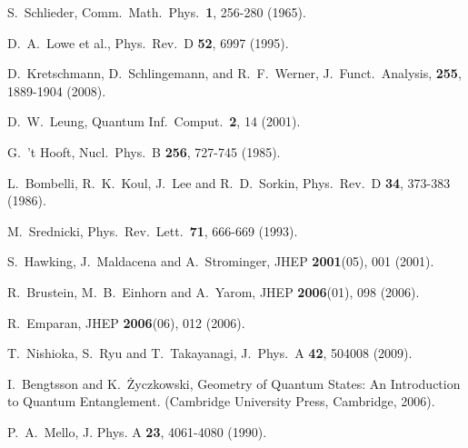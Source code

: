 \documentclass[aps,12pt]{revtex4}
\begin{document}
\begin{thebibliography}{16}
 S.\ Schlieder,
Comm.\ Math.\ Phys.\ {\bf 1}, 256-280 (1965).

 D.\ A.\ Lowe {et al.},
Phys.\ Rev.\ D {\bf 52}, 6997 (1995).

 D.\ Kretschmann, D.\ Schlingemann, and R.\ F.\ Werner,
J.\ Funct.\ Analysis, {\bf 255}, 1889-1904 (2008).

 D.\ W.\ Leung,
Quantum Inf.\ Comput.\ {\bf 2}, 14 (2001).

 G.\ 't Hooft,
Nucl.\ Phys.\ B {\bf 256}, 727-745 (1985).

 L.\ Bombelli, R.\ K.\ Koul, J.\ Lee and R.\ D.\ Sorkin,
Phys.\ Rev.\ D {\bf 34}, 373-383 (1986).

 M.\ Srednicki,
Phys.\ Rev.\ Lett.\ {\bf 71}, 666-669 (1993).

 S.\ Hawking, J.\ Maldacena and A.\ Strominger,
JHEP {\bf 2001}(05), 001 (2001).

 R.\ Brustein, M.\ B.\ Einhorn and A.\ Yarom,
JHEP {\bf 2006}(01), 098 (2006).

 R.\ Emparan,
JHEP {\bf 2006}(06), 012 (2006).

 T.\ Nishioka, S.\ Ryu and T.\ Takayanagi,
J.\ Phys.\ A {\bf 42}, 504008 (2009).

 I.\ Bengtsson and K.\ \.{Z}yczkowski,
Geometry of Quantum States: An Introduction to Quantum Entanglement.
(Cambridge University Press, Cambridge, 2006).

 P.\ A.\ Mello,
J. Phys. A {\bf 23}, 4061-4080 (1990).

\end{thebibliography}
\end{document}
